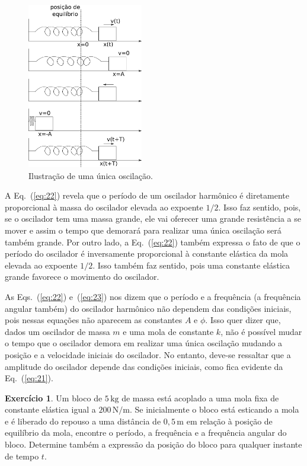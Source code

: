 \documentclass[twocolumn=on,fontsize=12pt,DIV=calc]{scrartcl}
\theoremstyle{definition}
\newtheorem{ex}{Exercício}[section]
\begin{document}
\begin{figure}[ht]
  \centering
  \includegraphics[width=0.45\textwidth,keepaspectratio]{aux/oscilador_periodo.pdf}
  \caption{Ilustração de uma única oscilação.}
  \label{fig:oscilador_periodo}
\end{figure}

A Eq.~(\ref{eq:22}) revela que o período de um oscilador harmônico é
diretamente proporcional à massa do oscilador elevada ao expoente
$1/2$. Isso faz sentido, pois, se o oscilador tem uma massa grande,
ele vai oferecer uma grande resistência a se mover e assim o tempo que
demorará para realizar uma única oscilação será também grande. Por
outro lado, a Eq.~(\ref{eq:22}) também expressa o fato de que o
período do oscilador é inversamente proporcional à constante elástica
da mola elevada ao expoente $1/2$. Isso também faz sentido, pois uma
constante elástica grande favorece o movimento do oscilador.

As Eqs.~(\ref{eq:22}) e~(\ref{eq:23}) nos dizem que o período e a
frequência (a frequência angular também) do oscilador harmônico não
dependem das condições iniciais, pois nessas equações não aparecem as
constantes $A$ e $\phi$. Isso quer dizer que, dados um oscilador de
massa $m$ e uma mola de constante $k$, não é possível mudar o tempo
que o oscilador demora em realizar uma única oscilação mudando a
posição e a velocidade iniciais do oscilador. No entanto, deve-se
ressaltar que a amplitude do oscilador depende das condições iniciais,
como fica evidente da Eq.~(\ref{eq:21}).

\begin{ex}
  Um bloco de $5\,\mathrm{kg}$ de massa está acoplado a uma mola fixa
  de constante elástica igual a $200\,\mathrm{N/m}$. Se inicialmente o
  bloco está esticando a mola e é liberado do repouso a uma distância
  de $0{,}5\,\mathrm{m}$ em relação à posição de equilíbrio da mola,
  encontre o período, a frequência e a frequência angular do
  bloco. Determine também a expressão da posição do bloco para
  qualquer instante de tempo $t$.
\end{ex}
\end{document}
